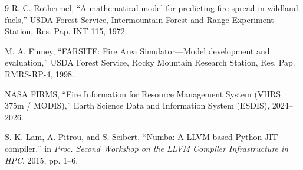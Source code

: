 \documentclass[twocolumn,10pt]{article}
\begin{document}
\begin{thebibliography}{9}
R. C. Rothermel, ``A mathematical model for predicting fire spread in wildland fuels,'' USDA Forest Service, Intermountain Forest and Range Experiment Station, Res. Pap. INT-115, 1972.

M. A. Finney, ``FARSITE: Fire Area Simulator---Model development and evaluation,'' USDA Forest Service, Rocky Mountain Research Station, Res. Pap. RMRS-RP-4, 1998.

NASA FIRMS, ``Fire Information for Resource Management System (VIIRS 375m / MODIS),'' Earth Science Data and Information System (ESDIS), 2024--2026.

S. K. Lam, A. Pitrou, and S. Seibert, ``Numba: A LLVM-based Python JIT compiler,'' in \textit{Proc. Second Workshop on the LLVM Compiler Infrastructure in HPC}, 2015, pp. 1--6.
\end{thebibliography}
\end{document}
